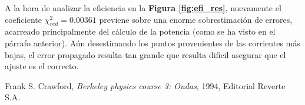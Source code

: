 \documentclass[11pt,a4paper]{article}
\begin{document}
A la hora de analizar la eficiencia en la \textbf{Figura \ref{fig:efi_res}}, nuevamente el coeficiente $\chi_{red}^{2} = 0.00361$ previene sobre una enorme sobrestimación de errores, acarreado principalmente del cálculo de la potencia (como se ha visto en el párrafo anterior). Aún desestimando los puntos provenientes de las corrientes más bajas, el error propagado resulta tan grande que resulta dificil asegurar que el ajuste es el correcto. 






\begin{thebibliography}{1}
  Frank S. Crawford, \textit{Berkeley physics course 3: Ondas}, 1994, Editorial Reverte S.A.
\end{thebibliography}
 
\end{document}
